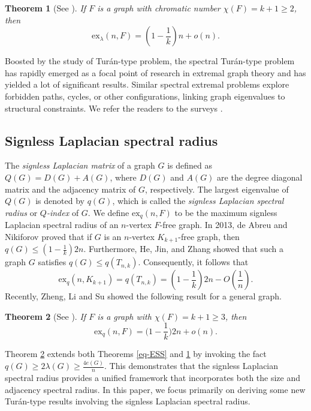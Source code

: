 \documentclass[11pt,a4paper]{article}
\theoremstyle{plain}
\newtheorem{theorem}{Theorem}[section]
\theoremstyle{definition}
\begin{document}
\begin{theorem}[See \cite{Gui1996,ESB2009}]
 \label{eq-a-ESS}  
 If $F$ is a graph with chromatic number $\chi (F)=k+1 \ge 2$, then  
\begin{equation*}
    \mathrm{ex}_{\lambda}(n,F) 
    = \left(1- \frac{1}{k}\right)n + o(n). 
\end{equation*} 
\end{theorem}

 

 Boosted by the study of Tur\'{a}n-type problem, 
 the spectral Tur\'{a}n-type problem has rapidly emerged as a focal point of research in extremal graph theory and has yielded a lot of significant results.  
 Similar spectral extremal problems explore forbidden paths, cycles, or other configurations, linking graph eigenvalues to structural constraints. We refer the readers
 to the surveys \cite{LiLF,Niki2011}. 



\subsection{Signless Laplacian spectral radius}


The {\it signless Laplacian matrix} of a graph $G$ 
is defined as $Q(G)=D(G)+A(G)$, 
where $D(G)$ and $A(G)$ are the degree diagonal matrix and the adjacency matrix of $G$, respectively. 
The largest eigenvalue of $Q(G)$ is denoted by  $q(G)$, which is called the {\it signless Laplacian spectral radius} or {\it $Q$-index} of $G$.  
We define $\mathrm{ex}_{q}(n,F)$ to be the maximum signless Laplacian spectral radius of an $n$-vertex $F$-free graph.  In 2013, de Abreu and Nikiforov \cite{AN2013} proved that if $G$ is an $n$-vertex $K_{k+1}$-free graph, then $ q(G) \le \left( 1-\frac{1}{k}\right)2n$. 
Furthermore, He, Jin, and Zhang \cite{HJZ2013} showed that such a graph $G$ satisfies $q(G)\le q(T_{n,k})$. Consequently, it follows that  
\begin{equation} \label{eq-q-Turan}
    \mathrm{ex}_q(n,K_{k+1}) = q(T_{n,k})= \left( 1- \frac{1}{k}\right)2n - O(\frac{1}{n}). 
\end{equation}
Recently, Zheng, Li and Su \cite{ZLS2025} showed the following result for a general graph. 

\begin{theorem}[See \cite{ZLS2025}] \label{eq-q-ESS} 
    If $F$ is a graph with $\chi (F)=k+1 \geq 3$, then
\begin{equation*} 
    \mathrm{ex}_{q}(n,F)=\bigg(1-\frac{1}{k}\bigg)2n + o(n). 
\end{equation*} 
\end{theorem} 
 Theorem \ref{eq-q-ESS} extends both Theorems \ref{eq-ESS} and \ref{eq-a-ESS} by invoking the fact $q(G)\ge 2\lambda (G) \ge \frac{4e(G)}{n}$. 
This demonstrates that the signless Laplacian spectral radius provides a unified framework that incorporates both the size and adjacency spectral radius. 
In this paper,  
we focus primarily on deriving some new Tur\'{a}n-type results involving the signless Laplacian spectral radius. 
\end{document}
